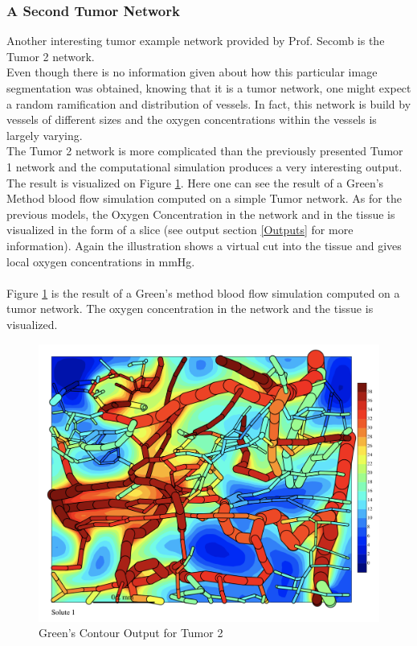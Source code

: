 \newpage
\subsubsection*{A Second Tumor Network}

Another interesting tumor example network provided by Prof. Secomb is the Tumor 2 network.
\\Even though there is no information given about how this particular image segmentation was obtained, knowing that it is a tumor network, one might expect a random ramification and distribution of vessels. In fact, this network is build by vessels of different sizes and the oxygen concentrations within the vessels is largely varying.
\\The Tumor 2 network is more complicated than the previously presented Tumor 1 network and the computational simulation produces a very interesting output. The result is visualized on Figure \ref{fig:Contour_TumorDuke}. Here one can see the result of a Green's Method blood flow simulation computed on a simple Tumor network. As for the previous models, the Oxygen Concentration in the network and in the tissue is visualized in the form of a slice (see output section \ref{Outputs} for more information). Again the illustration shows a virtual cut into the tissue and gives local oxygen concentrations in mmHg.\\\\
Figure \ref{fig:Contour_TumorDuke}  is the result of a Green's method blood flow simulation computed on a tumor network. The oxygen concentration in the network and the tissue is visualized.\\
\begin{figure}[h]
\centering
\includegraphics[width=120mm]{Contour_TumorDuke}
\caption{\footnotesize Green's Contour Output for Tumor 2}
\label{fig:Contour_TumorDuke}
\end{figure}\\
